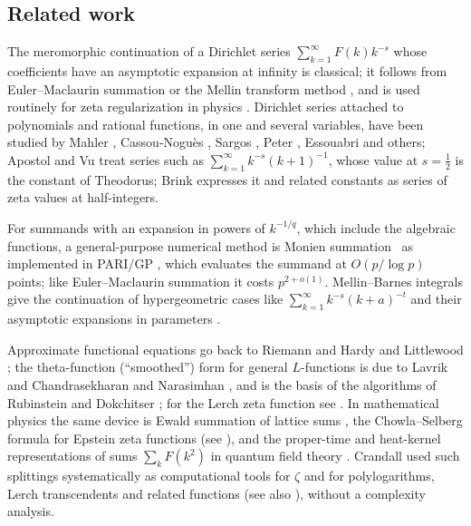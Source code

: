 \documentclass[11pt,reqno]{amsart}
\theoremstyle{definition}
\theoremstyle{remark}
\begin{document}
\subsection{Related work}
\label{sec:related}
The meromorphic continuation of a Dirichlet series $\sum_{k=1}^{\infty} F(k)k^{-s}$ whose coefficients have an asymptotic
expansion at infinity is classical; it follows from Euler--Maclaurin summation or the Mellin transform method
\cite{Zag06,FGD95}, and is used routinely for zeta regularization in physics \cite{Eli95,Kir02}. Dirichlet series
attached to polynomials and rational functions, in one and several variables, have been studied by Mahler
\cite{Mah28}, Cassou-Nogu\`es \cite{CN81}, Sargos \cite{Sar84}, Peter \cite{Pet98}, Essouabri \cite{Ess97}
and others; Apostol and Vu \cite{AV84} treat series such as $\sum_{k=1}^{\infty} k^{-s}(k+1)^{-1}$, whose value at $s = \frac12$
is the constant of Theodorus; Brink \cite{Bri12} expresses it and related constants as series of zeta values at
half-integers.

For summands with an expansion in powers of $k^{-1/q}$, which include the algebraic functions, a
general-purpose numerical method is Monien summation~\cite{Mon10} as implemented in PARI/GP \cite{BC21}, which evaluates the
summand at $O(p/\log p)$ points; like Euler--Maclaurin summation it costs $p^{2+o(1)}$. Mellin--Barnes integrals
give the continuation of hypergeometric cases like $\sum_{k=1}^{\infty} k^{-s}(k+a)^{-t}$ and their asymptotic
expansions in parameters \cite{Kat97}.

Approximate functional equations go back to Riemann \cite{Rie59} and
Hardy and Littlewood \cite{HL23}; the theta-function (``smoothed'') form for general $L$-functions is due to
Lavrik \cite{Lav68} and Chandrasekharan and Narasimhan \cite{CN62}, and is the basis of the algorithms of Rubinstein
\cite{Rub05} and Dokchitser \cite{Dok04}; for the Lerch zeta function see \cite{GLS03}. In mathematical physics the
same device is Ewald summation of lattice sums \cite{Ewa21}, the Chowla--Selberg formula for Epstein zeta functions
\cite{CS67} (see \cite{BGMWZ13}), and the proper-time and heat-kernel representations of sums $\sum_kF(k^2)$ in quantum
field theory \cite{Sch51,Eli95,Kir02}. Crandall used such splittings systematically as computational tools for $\zeta$
\cite{BBC00} and for polylogarithms, Lerch transcendents and related functions \cite{Cra12} (see also
\cite{Cof12,BB15}), without a complexity analysis.
\end{document}

